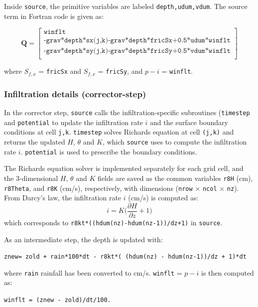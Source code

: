 \documentclass{article}
\newcommand{\code}[1]{\texttt{#1}}
\begin{document}
Inside \code{source}, the primitive variables are labeled \code{depth,udum,vdum}. 
The source term in Fortran code is given as:

\[ \mathbf{Q} = 
 \begin{bmatrix}
	\code{winflt}  \\[.1cm]
	\code{-grav*depth*sx(j,k)-grav*depth*fricSx+0.5*udum*winflt}\\[.1cm]
	\code{-grav*depth*sy(j,k)-grav*depth*fricSy+0.5*vdum*winflt}\\[.1cm]
\end{bmatrix} 
\]

where $S_{f,x}$ = \code{fricSx} and  $S_{f,x}$ = \code{fricSy}, and $p-i$ = \code{winflt}.


\subsubsection*{Infiltration details (corrector-step)}

In the corrector step, \code{source} calls the infiltration-specific subroutines (\code{timestep} and \code{potential} to update the infiltration rate $i$ and the surface boundary conditions at cell \code{j,k}. 
\code{timestep} solves Richards equation at cell \code{(j,k)} and returns the updated $H$, $\theta$ and $K$, which \code{source} uses to compute the infiltration rate $i$. \code{potential} is used to prescribe the boundary conditions. 

 The Richards equation solver is implemented separately for each grid cell, and the 3-dimensional $H$, $\theta$ and $K$  fields are saved as the common variables \code{r8H} (cm), \code{r8Theta}, and  \code{r8K} (cm/s), respectively, with dimensions (\code{nrow} $\times$ \code{ncol} $\times$ \code{nz}).\\ 


\noindent From Darcy's law, the infiltration rate $i$ (cm/s) is computed as:
$$ i =  K \bigg(\frac{\partial H}{\partial z} + 1\bigg ) $$
which corresponds to \code{r8kt*((hdum(nz)-hdum(nz-1))/dz+1)} in \code{source}.

\noindent  As an intermediate step, the depth is updated with: \\
\begin{center}
\code{znew=  zold + rain*100*dt - r8kt*( (hdum(nz) - hdum(nz-1))/dz + 1)*dt } 	
\end{center}
where \code{rain}  rainfall has been converted to cm/s.
 \code{winflt} = $p-i$  is then computed as:
\begin{center}
 \code{winflt = (znew - zold)/dt/100.} 	
\end{center}
\end{document}
